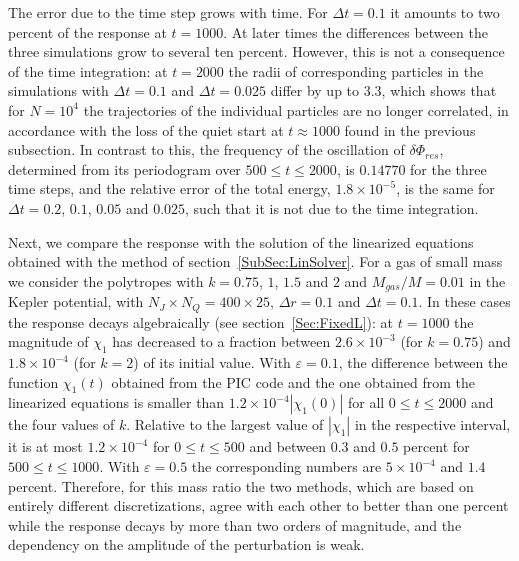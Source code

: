 The error due to the time step grows with time. For $\Delta t = 0.1$ it amounts to two percent of the response at $t = 1000$. At later times the differences between the three simulations grow to several ten percent. However, this is not a consequence of the time integration: at $t = 2000$ the radii of corresponding particles in the simulations with $\Delta t = 0.1$ and $\Delta t = 0.025$ differ by up to $3.3$, which shows that for $N = 10^4$ the trajectories of the individual particles are no longer correlated, in accordance with the loss of the quiet start at $t\approx 1000$ found in the previous subsection. In contrast to this, the frequency of the oscillation of $\delta\Phi_{res}$, determined from its periodogram over $500\leq t\leq 2000$, is $0.14770$ for the three time steps, and the relative error of the total energy, $1.8\times 10^{-5}$, is the same for $\Delta t = 0.2$, $0.1$, $0.05$ and $0.025$, such that it is not due to the time integration.

Next, we compare the response with the solution of the linearized equations obtained with the method of section~\ref{SubSec:LinSolver}. For a gas of small mass we consider the polytropes with $k = 0.75$, $1$, $1.5$ and $2$ and $M_{gas}/M = 0.01$ in the Kepler potential, with $N_J\times N_Q = 400\times 25$, $\Delta r = 0.1$ and $\Delta t = 0.1$. In these cases the response decays algebraically (see section~\ref{Sec:FixedL}): at $t = 1000$ the magnitude of $\chi_1$ has decreased to a fraction between $2.6\times 10^{-3}$ (for $k = 0.75$) and $1.8\times 10^{-4}$ (for $k = 2$) of its initial value. With $\varepsilon = 0.1$, the difference between the function $\chi_1(t)$ obtained from the PIC code and the one obtained from the linearized equations is smaller than $1.2\times 10^{-4}|\chi_1(0)|$ for all $0\leq t\leq 2000$ and the four values of $k$. Relative to the largest value of $|\chi_1|$ in the respective interval, it is at most $1.2\times 10^{-4}$ for $0\leq t\leq 500$ and between $0.3$ and $0.5$ percent for $500\leq t\leq 1000$. With $\varepsilon = 0.5$ the corresponding numbers are $5\times 10^{-4}$ and $1.4$ percent. Therefore, for this mass ratio the two methods, which are based on entirely different discretizations, agree with each other to better than one percent while the response decays by more than two orders of magnitude, and the dependency on the amplitude of the perturbation is weak.


